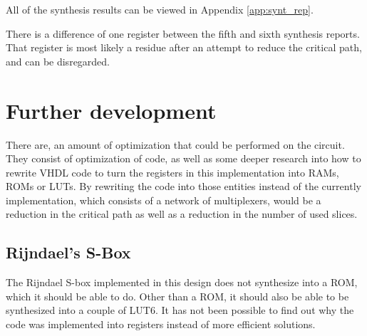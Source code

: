 
All of the synthesis results can be viewed in Appendix 
\ref{app:synt_rep}.


There is a difference of one register between the fifth and sixth 
synthesis reports. That register is most likely a residue after an 
attempt to reduce the critical path, and can be disregarded.

\section{Further development}
There are, an amount of optimization that could be performed on the 
circuit. They consist of optimization of code, as well as some deeper 
research into how to rewrite VHDL code to turn the registers in this 
implementation into RAMs, ROMs or LUTs. By rewriting the code into 
those entities instead of the currently implementation, which consists 
of a network of multiplexers, would be a reduction in the critical path
as well as a reduction in the number of used slices.

\subsection{Rijndael's S-Box}
The Rijndael S-box implemented in this design does not synthesize into 
a ROM, which it should be able to do. Other than a ROM, it should also 
be able to be synthesized into a couple of LUT6. It has not been 
possible to find out why the code was implemented into registers 
instead of more efficient solutions.

